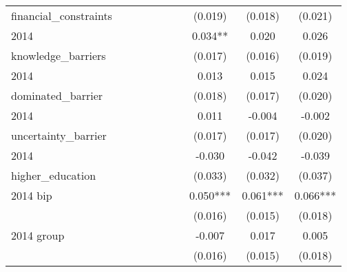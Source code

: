 \begin{table}[htbp]
\begin{tabular}{l*{9}{c}}
financial\_constraints&               &               &               &               &               &               &     (0.019)   &     (0.018)   &     (0.021)   \\
2014                &               &               &               &               &               &               &       0.034** &       0.020   &       0.026   \\
knowledge\_barriers  &               &               &               &               &               &               &     (0.017)   &     (0.016)   &     (0.019)   \\
2014                &               &               &               &               &               &               &       0.013   &       0.015   &       0.024   \\
dominated\_barrier   &               &               &               &               &               &               &     (0.018)   &     (0.017)   &     (0.020)   \\
2014                &               &               &               &               &               &               &       0.011   &      -0.004   &      -0.002   \\
uncertainty\_barrier &               &               &               &               &               &               &     (0.017)   &     (0.017)   &     (0.020)   \\
2014                &               &               &               &               &               &               &      -0.030   &      -0.042   &      -0.039   \\
higher\_education    &               &               &               &               &               &               &     (0.033)   &     (0.032)   &     (0.037)   \\
2014 bip            &               &               &               &               &               &               &       0.050***&       0.061***&       0.066***\\
                    &               &               &               &               &               &               &     (0.016)   &     (0.015)   &     (0.018)   \\
2014 group          &               &               &               &               &               &               &      -0.007   &       0.017   &       0.005   \\
                    &               &               &               &               &               &               &     (0.016)   &     (0.015)   &     (0.018)   \\

\end{tabular}
\end{table}
